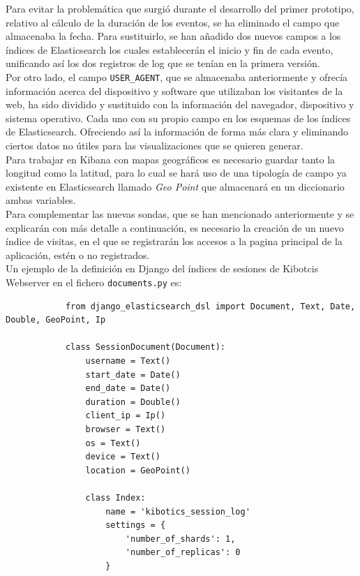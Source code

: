 \documentclass[a4paper, 12pt]{book}
\begin{document}
		Para evitar la problemática que surgió durante el desarrollo del primer prototipo, relativo al cálculo de la duración de los eventos, se ha eliminado el campo que almacenaba la fecha. Para sustituirlo, se han añadido dos nuevos campos a los índices de Elasticsearch los cuales establecerán el inicio y fin de cada evento, unificando así los dos registros de log que se tenían en la primera versión.\\
		
		Por otro lado, el campo \texttt{USER\_AGENT}, que se almacenaba anteriormente y ofrecía información acerca del dispositivo y software que utilizaban los visitantes de la web, ha sido dividido y sustituido con la información del navegador, dispositivo y sistema operativo. Cada uno con su propio campo en los esquemas de los índices de Elasticsearch. Ofreciendo así la información de forma más clara y eliminando ciertos datos no útiles para las visualizaciones que se quieren generar.\\
		
		Para trabajar en Kibana con mapas geográficos es necesario guardar tanto la longitud como la latitud, para lo cual se hará uso de una tipología de campo ya existente en Elasticsearch llamado \textit{Geo Point} que almacenará en un diccionario ambas variables.\\
		
		Para complementar las nuevas sondas, que se han mencionado anteriormente y se explicarán con más detalle a continuación, es necesario la creación de un nuevo índice de visitas, en el que se registrarán los accesos a la pagina principal de la aplicación, estén o no registrados.\\
		
		Un ejemplo de la definición en Django del índices de sesiones de Kibotcis Webserver en el fichero \texttt{documents.py} es:
		
		{\footnotesize
		\begin{verbatim}
			from django_elasticsearch_dsl import Document, Text, Date, Double, GeoPoint, Ip
			
			class SessionDocument(Document):
			    username = Text()
			    start_date = Date()
			    end_date = Date()
			    duration = Double()
			    client_ip = Ip()
			    browser = Text()
			    os = Text()
			    device = Text()
			    location = GeoPoint()
			
			    class Index:
			        name = 'kibotics_session_log'
			        settings = {
			            'number_of_shards': 1,
			            'number_of_replicas': 0
			        }		
		\end{verbatim}
		}
		
\end{document}
